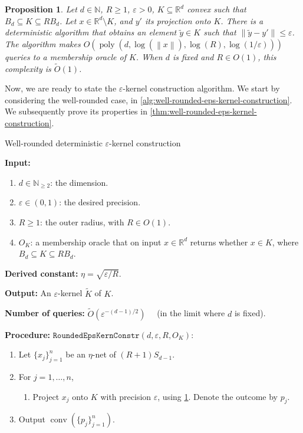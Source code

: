\documentclass[11pt]{article}
\newtheorem{proposition}[theorem]{Proposition}
\newcommand{\N}{\ensuremath{\mathbb{N}}}
\newcommand{\R}{\ensuremath{\mathbb{R}}}
\newcommand{\norm}[1]{\ensuremath{\left\|#1\right\|}}
\DeclareMathOperator{\poly}{poly}
\DeclareMathOperator{\conv}{conv}
\begin{document}
    \begin{proposition}
        \label{prop:alg-proj}
        Let $d \in \N$, $R \geq 1$, $\varepsilon > 0$, $K \subseteq \R^d$ convex such that $B_d \subseteq K \subseteq RB_d$. Let $x \in \R^d \setminus K$, and $y'$ its projection onto $K$. There is a deterministic algorithm that obtains an element $\widetilde{y} \in K$ such that $\norm{\widetilde{y} - y'} \leq \varepsilon$. The algorithm makes $O(\poly(d,\log(\norm{x}),\log(R),\log(1/\varepsilon)))$ queries to a membership oracle of $K$. When $d$ is fixed and $R \in O(1)$, this complexity is $\widetilde{O}(1)$.
    \end{proposition}

    Now, we are ready to state the $\varepsilon$-kernel construction algorithm. We start by considering the well-rounded case, in \cref{alg:well-rounded-eps-kernel-construction}. We subsequently prove its properties in \cref{thm:well-rounded-eps-kernel-construction}.

    \begin{algorithm}[!ht]
        \caption{Well-rounded deterministic $\varepsilon$-kernel construction~\cite{yu2008practical}}
        \label{alg:well-rounded-eps-kernel-construction}
        \textbf{Input:}
        \begin{enumerate}[nosep]
            \item $d \in \N_{\geq 2}$: the dimension.
            \item $\varepsilon \in (0,1)$: the desired precision.
            \item $R \geq 1$: the outer radius, with $R \in O(1)$.
            \item $O_K$: a membership oracle that on input $x \in \R^d$ returns whether $x \in K$, where $B_d \subseteq K \subseteq RB_d$.
        \end{enumerate}
        \textbf{Derived constant:} $\eta = \sqrt{\varepsilon/R}$.

        \textbf{Output:} An $\varepsilon$-kernel $\widetilde{K}$ of $K$.

        \textbf{Number of queries:} $\widetilde{O}(\varepsilon^{-(d-1)/2})\quad$ (in the limit where $d$ is fixed).

        \textbf{Procedure:} $\texttt{RoundedEpsKernConstr}(d, \varepsilon, R, O_K)$:
        \begin{enumerate}[nosep]
            \item Let $\{x_j\}_{j=1}^n$ be an $\eta$-net of $(R+1)S_{d-1}$.
            \item For $j = 1, \dots, n$,
            \begin{enumerate}[nosep]
                \item Project $x_j$ onto $K$ with precision $\varepsilon$, using \cref{prop:alg-proj}. Denote the outcome by $p_j$.
            \end{enumerate}
            \item Output $\conv(\{p_j\}_{j=1}^n)$.
        \end{enumerate}
    \end{algorithm}
\end{document}
